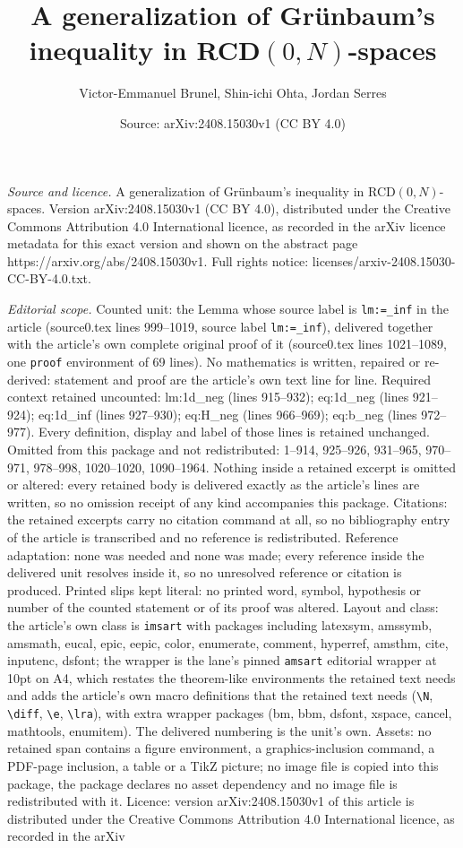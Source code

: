 \documentclass[10pt,a4paper]{amsart}
\title[A generalization of Gr\"unbaum's inequality in RCD$(0,N)$-sp]{A generalization of Gr\"unbaum's inequality in RCD$(0,N)$-spaces}
\author{Victor-Emmanuel Brunel, Shin-ichi Ohta, Jordan Serres}
\date{Source: arXiv:2408.15030v1 (CC BY 4.0)}
\begin{document}
\maketitle

\noindent\emph{Source and licence.} A generalization of Gr\"unbaum's inequality in RCD$(0,N)$-spaces. Version arXiv:2408.15030v1 (CC BY 4.0), distributed under the Creative Commons Attribution 4.0 International licence, as recorded in the arXiv licence metadata for this exact version and shown on the abstract page https://arxiv.org/abs/2408.15030v1. Full rights notice: licenses/arxiv-2408.15030-CC-BY-4.0.txt.\par\smallskip

\noindent\textit{Editorial scope.} Counted unit: the Lemma whose source label is \texttt{lm:=\_inf} in the article (source0.tex lines 999--1019, source label \texttt{lm:=\_inf}), delivered together with the article's own complete original proof of it (source0.tex lines 1021--1089, one \texttt{proof} environment of 69 lines). No mathematics is written, repaired or re-derived: statement and proof are the article's own text line for line. Required context retained uncounted: lm:1d\_neg (lines 915--932); eq:1d\_neg (lines 921--924); eq:1d\_inf (lines 927--930); eq:H\_neg (lines 966--969); eq:b\_neg (lines 972--977). Every definition, display and label of those lines is retained unchanged. Omitted from this package and not redistributed: 1--914, 925--926, 931--965, 970--971, 978--998, 1020--1020, 1090--1964. Nothing inside a retained excerpt is omitted or altered: every retained body is delivered exactly as the article's lines are written, so no omission receipt of any kind accompanies this package. Citations: the retained excerpts carry no citation command at all, so no bibliography entry of the article is transcribed and no reference is redistributed. Reference adaptation: none was needed and none was made; every reference inside the delivered unit resolves inside it, so no unresolved reference or citation is produced. Printed slips kept literal: no printed word, symbol, hypothesis or number of the counted statement or of its proof was altered. Layout and class: the article's own class is \texttt{imsart} with packages including latexsym, amssymb, amsmath, eucal, epic, eepic, color, enumerate, comment, hyperref, amsthm, cite, inputenc, dsfont; the wrapper is the lane's pinned \texttt{amsart} editorial wrapper at 10pt on A4, which restates the theorem-like environments the retained text needs and adds the article's own macro definitions that the retained text needs (\texttt{\textbackslash N}, \texttt{\textbackslash diff}, \texttt{\textbackslash e}, \texttt{\textbackslash lra}), with extra wrapper packages (bm, bbm, dsfont, xspace, cancel, mathtools, enumitem). The delivered numbering is the unit's own. Assets: no retained span contains a figure environment, a graphics-inclusion command, a PDF-page inclusion, a table or a TikZ picture; no image file is copied into this package, the package declares no asset dependency and no image file is redistributed with it. Licence: version arXiv:2408.15030v1 of this article is distributed under the Creative Commons Attribution 4.0 International licence, as recorded in the arXiv 
\end{document}
